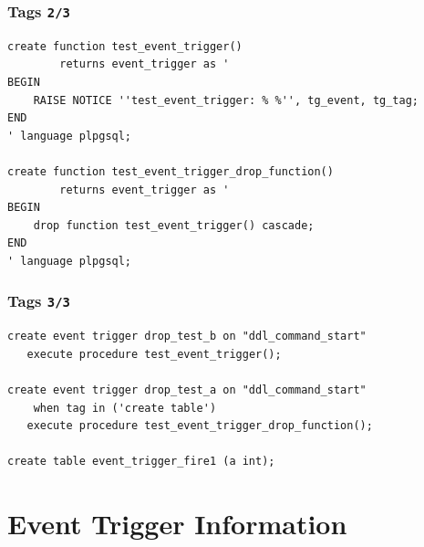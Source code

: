 \documentclass{beamer}
\begin{document}
\begin{frame}[fragile]
  \frametitle{Tags \texttt{2/3}}

\begin{verbatim}
create function test_event_trigger()
        returns event_trigger as '
BEGIN
    RAISE NOTICE ''test_event_trigger: % %'', tg_event, tg_tag;
END
' language plpgsql;

create function test_event_trigger_drop_function()
        returns event_trigger as '
BEGIN
    drop function test_event_trigger() cascade;
END
' language plpgsql;

\end{verbatim}
\end{frame}

\begin{frame}[fragile]
  \frametitle{Tags \texttt{3/3}}

  \vfill

\begin{verbatim}
create event trigger drop_test_b on "ddl_command_start"
   execute procedure test_event_trigger();

create event trigger drop_test_a on "ddl_command_start"
    when tag in ('create table')
   execute procedure test_event_trigger_drop_function();

create table event_trigger_fire1 (a int);
\end{verbatim}
\end{frame}


\section{Event Trigger Information}

\end{document}
